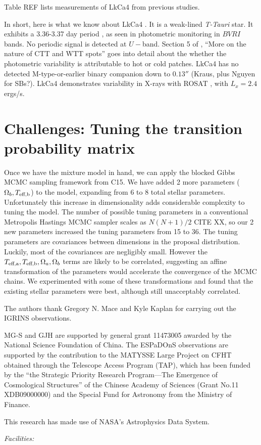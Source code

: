 \documentclass[twocolumn]{emulateapj}%
\newcommand{\iancze}{{\sc C15}}
\newcommand{\name}{LkCa4 }
\begin{document}
Table REF lists measurements of LkCa4 from previous studies.


In short, here is what we know about \name.  It is a weak-lined \emph{T-Tauri} star.  It exhibits a 3.36-3.37 day period \citep{vrba93,grankin94}, as seen in photometric monitoring in $BVRI$ bands.  No periodic signal is detected at $U-$band.  Section 5 of \citet{vrba93}, ``More on the nature of CTT and WTT spots'' goes into detail about the whether the photometric variability is attributable to hot or cold patches.  \name has no detected M-type-or-earlier binary companion down to $0.13''$ (Kraus, plus Nguyen for SBs?).  \name demonstrates variability in X-rays with ROSAT \citep{strom94}, with $L_{x}=2.4$ ergs/s.


\section{Challenges: Tuning the transition probability matrix}
\label{sec:MC-challenges}

Once we have the mixture model in hand, we can apply the blocked Gibbs MCMC sampling framework from \iancze.  We have added 2 more parameters ($\Omega_b, T_\textrm{eff,b}$) to the model, expanding from 6 to 8 total stellar parameters.  Unfortunately this increase in dimensionality adds considerable complexity to tuning the model.  The number of possible tuning parameters in a conventional Metropolis Hastings MCMC sampler scales as $N(N+1)/2$ CITE XX, so our 2 new parameters increased the tuning parameters from 15 to 36.  The tuning parameters are covariances between dimensions in the proposal distribution.  Luckily, most of the covariances are negligibly small.  However the $T_\textrm{eff,a}, T_\textrm{eff,b}, \Omega_a, \Omega_b$ terms are likely to be correlated, suggesting an affine transformation of the parameters would accelerate the convergence of the MCMC chains.  We experimented with some of these transformations and found that the existing stellar parameters were best, although still unacceptably correlated.


\acknowledgements
The authors thank Gregory N. Mace and Kyle Kaplan for carrying out the IGRINS observations. 

MG-S and GJH are supported by general grant 11473005 awarded by the National
Science Foundation of China.   The ESPaDOnS observations are supported by the contribution to the MATYSSE Large Project on CFHT obtained  through the Telescope Access Program (TAP), which has been funded by the ``the Strategic Priority Research Program---The Emergence of Cosmological Structures'' of the Chinese Academy of Sciences (Grant No.11 XDB09000000) and the Special Fund for Astronomy from the Ministry of Finance. 

This research has made use of NASA's Astrophysics Data System.

{\it Facilities:} 

\clearpage



\end{document}
